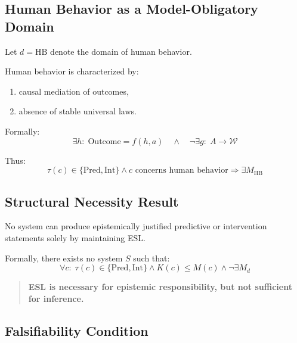 \subsection{Human Behavior as a Model-Obligatory Domain}

Let $d = \text{HB}$ denote the domain of human behavior.

Human behavior is characterized by:
\begin{enumerate}
    \item causal mediation of outcomes,
    \item absence of stable universal laws.
\end{enumerate}

Formally:
\[
\exists h:\; \text{Outcome} = f(h,a)
\quad \land \quad
\neg \exists g:\; A \rightarrow \mathcal{W}
\]

Thus:
\[
\tau(c) \in \{\text{Pred}, \text{Int}\}
\land c \text{ concerns human behavior}
\Rightarrow \exists M_{\text{HB}}
\]


\subsection{Structural Necessity Result}

\begin{theorem}
No system can produce epistemically justified predictive or intervention statements solely by maintaining ESL.
\end{theorem}

Formally, there exists no system $S$ such that:
\[
\forall c:\;
\tau(c) \in \{\text{Pred}, \text{Int}\}
\land K(c) \le M(c)
\land \neg \exists M_d
\]

\begin{quote}
\textbf{ESL is necessary for epistemic responsibility, but not sufficient for inference.}
\end{quote}


\subsection{Falsifiability Condition}

